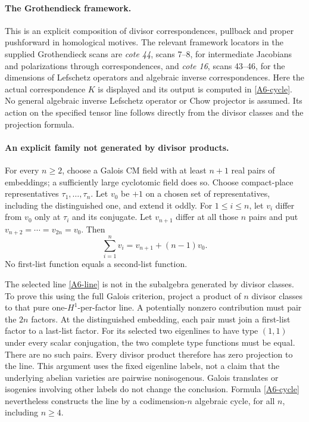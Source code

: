 \paragraph{The Grothendieck framework.}
This is an explicit composition of divisor correspondences,
pullback and proper pushforward in homological motives. The
relevant framework locators in the supplied Grothendieck scans
are \emph{cote 44}, scans 7--8, for intermediate Jacobians and
polarizations through correspondences, and \emph{cote 16},
scans 43--46, for the dimensions of Lefschetz operators and
algebraic inverse correspondences. Here the actual correspondence
$K$ is displayed and its output is computed in
\eqref{A6-cycle}. No general algebraic inverse Lefschetz
operator or Chow projector is assumed. Its action on the
specified tensor line follows directly from the divisor classes
and the projection formula.

\paragraph{An explicit family not generated by divisor products.}
For every $n\geq2$, choose a Galois CM field with at least $n+1$
real pairs of embeddings; a sufficiently large cyclotomic field
does so. Choose compact-place representatives
$\tau_1,\ldots,\tau_n$. Let $v_0$ be $+1$ on a chosen set of
representatives, including the distinguished one, and extend it
oddly. For $1\leq i\leq n$, let $v_i$ differ from $v_0$ only at
$\tau_i$ and its conjugate. Let $v_{n+1}$ differ at all those
$n$ pairs and put $v_{n+2}=\cdots=v_{2n}=v_0$. Then
\[
 \sum_{i=1}^n v_i=v_{n+1}+(n-1)v_0.
\]
No first-list function equals a second-list function.

The selected line \eqref{A6-line} is not in the subalgebra generated
by divisor classes. To prove this using the full Galois criterion,
project a product of $n$ divisor classes to that pure
one-$H^1$-per-factor line. A potentially nonzero contribution must
pair the $2n$ factors. At the distinguished embedding, each pair
must join a first-list factor to a last-list factor. For its selected
two eigenlines to have type $(1,1)$ under every scalar conjugation,
the two complete type functions must be equal. There are no such
pairs. Every divisor product therefore has zero projection to the
line. This argument uses the fixed eigenline labels, not a claim
that the underlying abelian varieties are pairwise nonisogenous.
Galois translates or isogenies involving other labels do not change
the conclusion. Formula \eqref{A6-cycle} nevertheless constructs
the line by a codimension-$n$ algebraic cycle, for all $n$, including
$n\geq4$.

